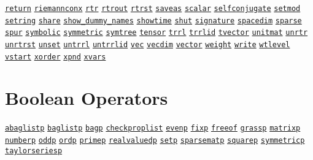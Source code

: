 \begin{list}{}
\hyperlink{command:RETURN}{\texttt{return}}
\hyperlink{command:RIEMANNCONX}{\texttt{riemannconx}}
\hyperlink{command:RTR}{\texttt{rtr}}
\hyperlink{command:RTROUT}{\texttt{rtrout}}
\hyperlink{command:RTRST}{\texttt{rtrst}}
\hyperlink{command:SAVEAS}{\texttt{saveas}}
\hyperlink{command:SCALAR}{\texttt{scalar}}
\hyperlink{command:SELFCONJUGATE}{\texttt{selfconjugate}}
\hyperlink{command:SETMOD}{\texttt{setmod}}
\hyperlink{command:SETRING}{\texttt{setring}}
\hyperlink{command:SHARE}{\texttt{share}}
\hyperlink{command:SHOW_DUMMY_NAMES}{\texttt{show\_dummy\_names}}
\hyperlink{command:SHOWTIME}{\texttt{showtime}}
\hyperlink{command:SHUT}{\texttt{shut}}
\hyperlink{command:SIGNATURE}{\texttt{signature}}
\hyperlink{command:SPACEDIM}{\texttt{spacedim}}
\hyperlink{command:SPARSE}{\texttt{sparse}}
\hyperlink{command:SPUR}{\texttt{spur}}
\hyperlink{target:modes}{\texttt{symbolic}}
\hyperlink{reserved:SYMMETRIC}{\texttt{symmetric}}
\hyperlink{command:SYMTREE}{\texttt{symtree}}
\hyperlink{command:TENSOR}{\texttt{tensor}}
\hyperlink{command:TRRL}{\texttt{trrl}}
\hyperlink{command:TRRLID}{\texttt{trrlid}}
\hyperlink{command:TVECTOR}{\texttt{tvector}}
\hyperlink{command:UNITMAT}{\texttt{unitmat}}
\hyperlink{command:UNRTR}{\texttt{unrtr}}
\hyperlink{command:UNRTRST}{\texttt{unrtrst}}
\hyperlink{command:UNSET}{\texttt{unset}}
\hyperlink{command:UNTRRL}{\texttt{untrrl}}
\hyperlink{command:UNTRRLID}{\texttt{untrrlid}}
\hyperlink{command:VEC}{\texttt{vec}}
\hyperlink{command:VECDIM}{\texttt{vecdim}}
\hyperlink{command:VECTOR}{\texttt{vector}}
\hyperlink{command:WEIGHT}{\texttt{weight}}
\hyperlink{command:WRITE}{\texttt{write}}
\hyperlink{command:WTLEVEL}{\texttt{wtlevel}}
\hyperlink{command:VSTART}{\texttt{vstart}}
\hyperlink{command:XORDER}{\texttt{xorder}}
\hyperlink{command:XPND}{\texttt{xpnd}}
\hyperlink{command:XVARS}{\texttt{xvars}}
\halfinterwordspace

\section{Boolean Operators}

\doubleinterwordspace
\hyperlink{operator:ABAGLISTP}{\texttt{abaglistp}}
\hyperlink{operator:BAGLISTP}{\texttt{baglistp}}
\hyperlink{operator:BAGP}{\texttt{bagp}}
\hyperlink{operator:CHECKPROPLIST}{\texttt{checkproplist}}
\hyperlink{operator:EVENP}{\texttt{evenp}}
\hyperlink{operator:FIXP}{\texttt{fixp}}
\hyperlink{operator:FREEOF}{\texttt{freeof}}
\hyperlink{operator:GRASSP}{\texttt{grassp}}
\hyperlink{operator:MATRIXP}{\texttt{matrixp}}
\hyperlink{operator:NUMBERP}{\texttt{numberp}}
\hyperlink{operator:ODDP}{\texttt{oddp}}
\hyperlink{operator:ORDP}{\texttt{ordp}}
\hyperlink{operator:PRIMEP}{\texttt{primep}}
\hyperlink{operator:REALVALUEDP}{\texttt{realvaluedp}}
\hyperlink{operator:SETP}{\texttt{setp}}
\hyperlink{operator:SPARSEMATP}{\texttt{sparsematp}}
\hyperlink{operator:SQUAREP}{\texttt{squarep}}
\hyperlink{operator:SYMMETRICP}{\texttt{symmetricp}}
\hyperlink{operator:TAYLORSERIESP}{\texttt{taylorseriesp}}
\halfinterwordspace


\end{list}
